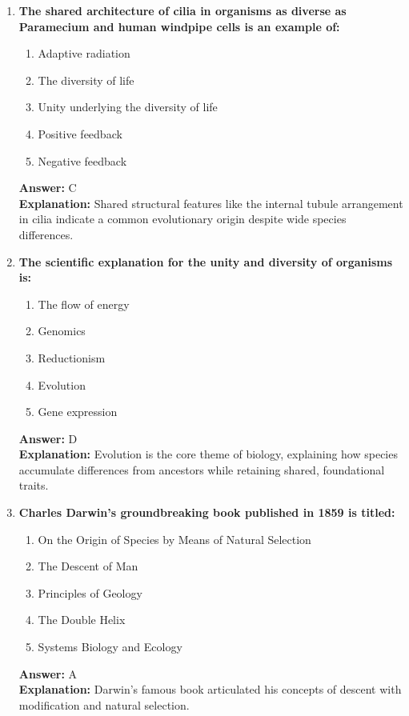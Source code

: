 \documentclass[11pt, a4paper]{article}
\begin{document}
\begin{enumerate}
\item \textbf{The shared architecture of cilia in organisms as diverse as Paramecium and human windpipe cells is an example of:}
\begin{enumerate}[label=\Alph*.]
    \item Adaptive radiation
    \item The diversity of life
    \item Unity underlying the diversity of life
    \item Positive feedback
    \item Negative feedback
\end{enumerate}
\textbf{Answer:} C \\
\textbf{Explanation:} Shared structural features like the internal tubule arrangement in cilia indicate a common evolutionary origin despite wide species differences.

\item \textbf{The scientific explanation for the unity and diversity of organisms is:}
\begin{enumerate}[label=\Alph*.]
    \item The flow of energy
    \item Genomics
    \item Reductionism
    \item Evolution
    \item Gene expression
\end{enumerate}
\textbf{Answer:} D \\
\textbf{Explanation:} Evolution is the core theme of biology, explaining how species accumulate differences from ancestors while retaining shared, foundational traits.

\item \textbf{Charles Darwin's groundbreaking book published in 1859 is titled:}
\begin{enumerate}[label=\Alph*.]
    \item On the Origin of Species by Means of Natural Selection
    \item The Descent of Man
    \item Principles of Geology
    \item The Double Helix
    \item Systems Biology and Ecology
\end{enumerate}
\textbf{Answer:} A \\
\textbf{Explanation:} Darwin's famous book articulated his concepts of descent with modification and natural selection.


\end{enumerate}
\end{document}
